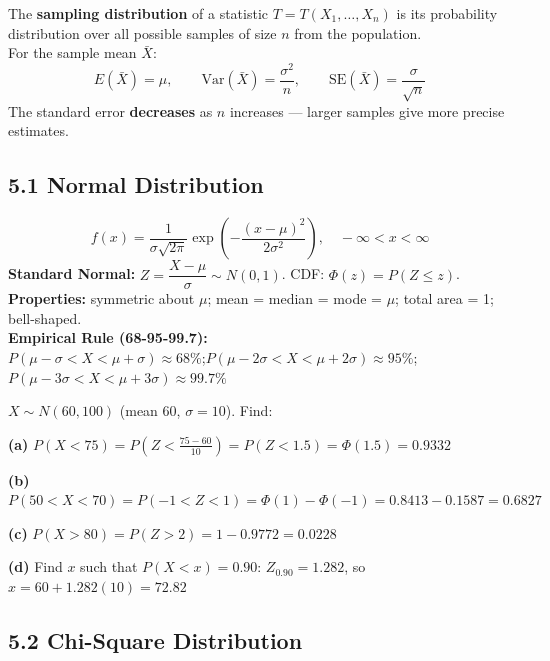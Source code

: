 \documentclass[12pt]{article}
\begin{document}
\begin{defbox}
The \textbf{sampling distribution} of a statistic $T=T(X_1,\ldots,X_n)$ is its probability distribution over all possible samples of size $n$ from the population.\\[6pt]
For the sample mean $\bar X$:
\[E(\bar X)=\mu, \qquad \text{Var}(\bar X)=\frac{\sigma^2}{n}, \qquad \text{SE}(\bar X)=\frac{\sigma}{\sqrt{n}}\]
The standard error \textbf{decreases} as $n$ increases --- larger samples give more precise estimates.
\end{defbox}

\subsection{5.1 Normal Distribution}

\begin{defbox}
\[f(x)=\frac{1}{\sigma\sqrt{2\pi}}\exp\!\left(-\frac{(x-\mu)^2}{2\sigma^2}\right), \quad -\infty<x<\infty\]
\textbf{Standard Normal:} $Z=\dfrac{X-\mu}{\sigma}\sim N(0,1)$. CDF: $\Phi(z)=P(Z\leq z)$.\\[6pt]
\textbf{Properties:} symmetric about $\mu$; mean = median = mode = $\mu$; total area = 1; bell-shaped.\\[4pt]
\textbf{Empirical Rule (68-95-99.7):}\\
$P(\mu-\sigma<X<\mu+\sigma)\approx68\%$;\quad $P(\mu-2\sigma<X<\mu+2\sigma)\approx95\%$;\quad $P(\mu-3\sigma<X<\mu+3\sigma)\approx99.7\%$
\end{defbox}

\begin{examplebox}
$X\sim N(60,100)$ (mean 60, $\sigma=10$). Find:

\textbf{(a)} $P(X<75)=P\!\left(Z<\frac{75-60}{10}\right)=P(Z<1.5)=\Phi(1.5)=0.9332$

\textbf{(b)} $P(50<X<70)=P(-1<Z<1)=\Phi(1)-\Phi(-1)=0.8413-0.1587=\mathbf{0.6827}$

\textbf{(c)} $P(X>80)=P(Z>2)=1-0.9772=\mathbf{0.0228}$

\textbf{(d)} Find $x$ such that $P(X<x)=0.90$: $Z_{0.90}=1.282$, so $x=60+1.282(10)=\mathbf{72.82}$
\end{examplebox}

\subsection{5.2 Chi-Square Distribution}
\end{document}
